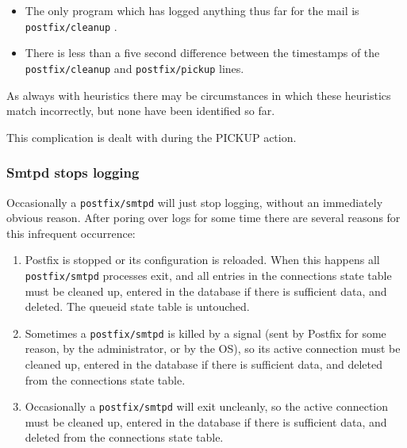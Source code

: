 \documentclass[a4paper,12pt,draft]{article}
\newcommand{\daemon}[1]{%
    \texttt{postfix/#1}%
}
\begin{document}
\begin{itemize}

    \item The only program which has logged anything thus far for the mail
        is \daemon{cleanup}.

    \item There is less than a five second difference between the
        timestamps of the \daemon{cleanup} and \daemon{pickup} lines.

\end{itemize}

As always with heuristics there may be circumstances in which these
heuristics match incorrectly,  but none have been identified so far.

This complication is dealt with during the PICKUP action.

\subsubsection{Smtpd stops logging}

\label{smtpd stops logging}

Occasionally a \daemon{smtpd} will just stop logging, without an
immediately obvious reason.  After poring over logs for some time there are
several reasons for this infrequent occurrence:

\begin{enumerate}

    \item Postfix is stopped or its configuration is reloaded.  When this
        happens all \daemon{smtpd} processes exit, and all entries in the
        connections state table must be cleaned up, entered in the database
        if there is sufficient data, and deleted.  The queueid state table
        is untouched.

    \item Sometimes a \daemon{smtpd} is killed by a signal (sent by Postfix
        for some reason, by the administrator, or by the OS), so its active
        connection must be cleaned up, entered in the database if there is
        sufficient data, and deleted from the connections state table.

    \item Occasionally a \daemon{smtpd} will exit uncleanly, so the active
        connection must be cleaned up, entered in the database if there is
        sufficient data, and deleted from the connections state table.

\end{enumerate}
\end{document}
